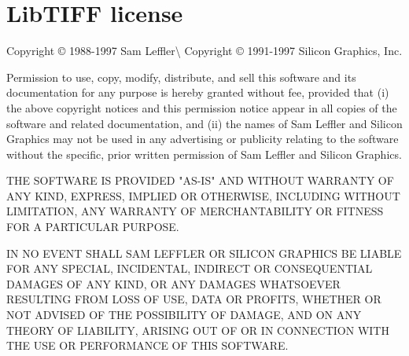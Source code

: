 \chapter{Lib\+TIFF license}
\hypertarget{md__cervi_a_i_2openslide-win64-20230414_2licenses_2libtiff_2_l_i_c_e_n_s_e}{}\label{md__cervi_a_i_2openslide-win64-20230414_2licenses_2libtiff_2_l_i_c_e_n_s_e}
\label{md__cervi_a_i_2openslide-win64-20230414_2licenses_2libtiff_2_l_i_c_e_n_s_e_autotoc_md10}%
%


Copyright © 1988-\/1997 Sam Leffler\textbackslash{} Copyright © 1991-\/1997 Silicon Graphics, Inc.

Permission to use, copy, modify, distribute, and sell this software and its documentation for any purpose is hereby granted without fee, provided that (i) the above copyright notices and this permission notice appear in all copies of the software and related documentation, and (ii) the names of Sam Leffler and Silicon Graphics may not be used in any advertising or publicity relating to the software without the specific, prior written permission of Sam Leffler and Silicon Graphics.

THE SOFTWARE IS PROVIDED "{}\+AS-\/\+IS"{} AND WITHOUT WARRANTY OF ANY KIND, EXPRESS, IMPLIED OR OTHERWISE, INCLUDING WITHOUT LIMITATION, ANY WARRANTY OF MERCHANTABILITY OR FITNESS FOR A PARTICULAR PURPOSE. ~\newline


IN NO EVENT SHALL SAM LEFFLER OR SILICON GRAPHICS BE LIABLE FOR ANY SPECIAL, INCIDENTAL, INDIRECT OR CONSEQUENTIAL DAMAGES OF ANY KIND, OR ANY DAMAGES WHATSOEVER RESULTING FROM LOSS OF USE, DATA OR PROFITS, WHETHER OR NOT ADVISED OF THE POSSIBILITY OF DAMAGE, AND ON ANY THEORY OF LIABILITY, ARISING OUT OF OR IN CONNECTION WITH THE USE OR PERFORMANCE OF THIS SOFTWARE. 